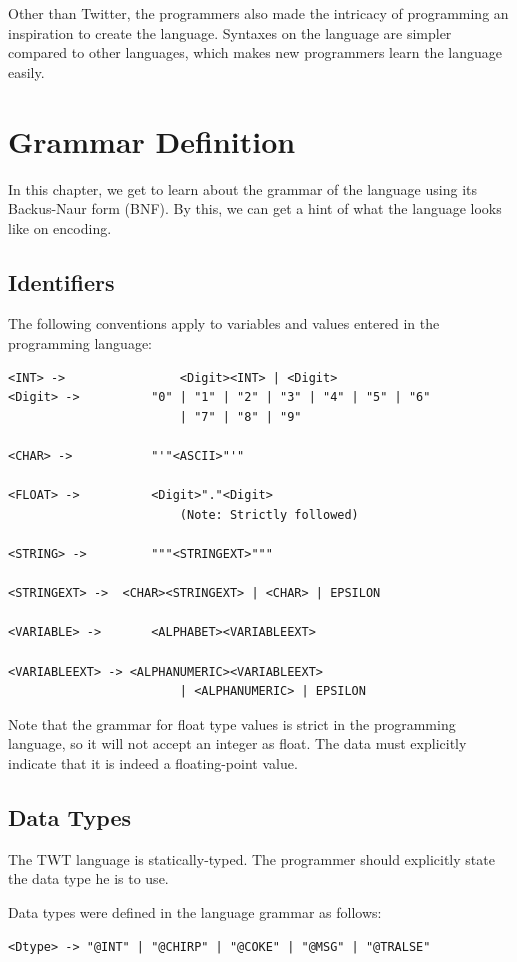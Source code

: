 \documentclass[11pt,a4paper]{report}
\begin{document}
Other than Twitter, the programmers also made the intricacy of programming an
inspiration to create the language. Syntaxes on the language are simpler
compared to other languages, which makes new programmers learn the language
easily.

\chapter{Grammar Definition}

In this chapter, we get to learn about the grammar of the language using its
Backus-Naur form (BNF). By this, we can get a hint of what the language looks
like on encoding.

\section{Identifiers}

The following conventions apply to variables and values entered in the
programming language:

\begin{lstlisting}
<INT> ->				<Digit><INT> | <Digit>
<Digit> ->			"0" | "1" | "2" | "3" | "4" | "5" | "6"
						| "7" | "8" | "9"

<CHAR> ->			"'"<ASCII>"'"

<FLOAT> ->			<Digit>"."<Digit>
						(Note: Strictly followed)

<STRING> -> 		"""<STRINGEXT>"""

<STRINGEXT> -> 	<CHAR><STRINGEXT> | <CHAR> | EPSILON

<VARIABLE> -> 		<ALPHABET><VARIABLEEXT>

<VARIABLEEXT> -> <ALPHANUMERIC><VARIABLEEXT>
						| <ALPHANUMERIC> | EPSILON
\end{lstlisting}

Note that the grammar for float type values is strict in the programming
language, so it will not accept an integer as float. The data must explicitly
indicate that it is indeed a floating-point value.

\section{Data Types}

The TWT language is statically-typed. The programmer should explicitly state the
data type he is to use.

Data types were defined in the language grammar as follows:

\begin{lstlisting}
<Dtype> -> "@INT" | "@CHIRP" | "@COKE" | "@MSG" | "@TRALSE"
\end{lstlisting}
\end{document}
